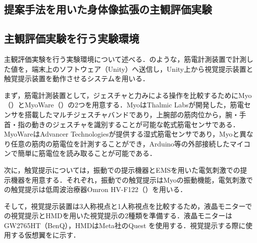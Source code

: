 \begin{small}
\section{提案手法を用いた身体像拡張の主観評価実験}

  \subsection{主観評価実験を行う実験環境}
    
    主観評価実験を行う実験環境について述べる．のような，筋電計測装置で計測した値を，端末上のソフトウェア（Unity）へ送信し，Unity上から視覚提示装置と触覚提示装置を動作させるシステムを用いる．



    まず，筋電計測装置として，ジェスチャと力みによる操作を比較するためにMyo（）とMyoWare（）の2つを用意する．MyoはThalmic Labsが開発した，筋電センサを搭載したマルチジェスチャバンドであり，上腕部の筋肉位から，腕・手首・指の動きのジェスチャを識別することが可能な乾式筋電センサである．MyoWareはAdvancer Technologiesが提供する湿式筋電センサであり，Myoと異なり任意の筋肉の筋電位を計測することができ，Arduino等の外部接続したマイコンで簡単に筋電位を読み取ることが可能である．

    次に，触覚提示については，振動での提示機器とEMSを用いた電気刺激での提示機器を用意する．それぞれ，振動での触覚提示はMyoの振動機能，電気刺激での触覚提示は低周波治療器Omron HV-F122（）を用いる．


    そして，視覚提示装置は3人称視点と1人称視点を比較するため，液晶モニターでの視覚提示とHMDを用いた視覚提示の2種類を準備する．液晶モニターはGW2765HT（BenQ），HMDはMeta社のQuest
    を使用する．視覚提示する際に使用する仮想翼をに示す．


\end{small}
